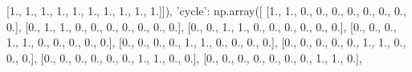 \documentclass[11pt]{article}
\newenvironment{Shaded}{}{}
\newcommand{\DecValTok}[1]{\textcolor[rgb]{0.25,0.63,0.44}{{#1}}}
\newcommand{\StringTok}[1]{\textcolor[rgb]{0.25,0.44,0.63}{{#1}}}
\newcommand{\NormalTok}[1]{{#1}}
\begin{document}
\begin{Shaded}
\begin{Highlighting}[]
\NormalTok{        [}\DecValTok{1}\NormalTok{., }\DecValTok{1}\NormalTok{., }\DecValTok{1}\NormalTok{., }\DecValTok{1}\NormalTok{., }\DecValTok{1}\NormalTok{., }\DecValTok{1}\NormalTok{., }\DecValTok{1}\NormalTok{., }\DecValTok{1}\NormalTok{., }\DecValTok{1}\NormalTok{., }\DecValTok{1}\NormalTok{.]]),}
    \StringTok{'cycle'}\NormalTok{: np.array([}
\NormalTok{        [}\DecValTok{1}\NormalTok{., }\DecValTok{1}\NormalTok{., }\DecValTok{0}\NormalTok{., }\DecValTok{0}\NormalTok{., }\DecValTok{0}\NormalTok{., }\DecValTok{0}\NormalTok{., }\DecValTok{0}\NormalTok{., }\DecValTok{0}\NormalTok{., }\DecValTok{0}\NormalTok{., }\DecValTok{0}\NormalTok{.],}
\NormalTok{        [}\DecValTok{0}\NormalTok{., }\DecValTok{1}\NormalTok{., }\DecValTok{1}\NormalTok{., }\DecValTok{0}\NormalTok{., }\DecValTok{0}\NormalTok{., }\DecValTok{0}\NormalTok{., }\DecValTok{0}\NormalTok{., }\DecValTok{0}\NormalTok{., }\DecValTok{0}\NormalTok{., }\DecValTok{0}\NormalTok{.],}
\NormalTok{        [}\DecValTok{0}\NormalTok{., }\DecValTok{0}\NormalTok{., }\DecValTok{1}\NormalTok{., }\DecValTok{1}\NormalTok{., }\DecValTok{0}\NormalTok{., }\DecValTok{0}\NormalTok{., }\DecValTok{0}\NormalTok{., }\DecValTok{0}\NormalTok{., }\DecValTok{0}\NormalTok{., }\DecValTok{0}\NormalTok{.],}
\NormalTok{        [}\DecValTok{0}\NormalTok{., }\DecValTok{0}\NormalTok{., }\DecValTok{0}\NormalTok{., }\DecValTok{1}\NormalTok{., }\DecValTok{1}\NormalTok{., }\DecValTok{0}\NormalTok{., }\DecValTok{0}\NormalTok{., }\DecValTok{0}\NormalTok{., }\DecValTok{0}\NormalTok{., }\DecValTok{0}\NormalTok{.],}
\NormalTok{        [}\DecValTok{0}\NormalTok{., }\DecValTok{0}\NormalTok{., }\DecValTok{0}\NormalTok{., }\DecValTok{0}\NormalTok{., }\DecValTok{1}\NormalTok{., }\DecValTok{1}\NormalTok{., }\DecValTok{0}\NormalTok{., }\DecValTok{0}\NormalTok{., }\DecValTok{0}\NormalTok{., }\DecValTok{0}\NormalTok{.],}
\NormalTok{        [}\DecValTok{0}\NormalTok{., }\DecValTok{0}\NormalTok{., }\DecValTok{0}\NormalTok{., }\DecValTok{0}\NormalTok{., }\DecValTok{0}\NormalTok{., }\DecValTok{1}\NormalTok{., }\DecValTok{1}\NormalTok{., }\DecValTok{0}\NormalTok{., }\DecValTok{0}\NormalTok{., }\DecValTok{0}\NormalTok{.],}
\NormalTok{        [}\DecValTok{0}\NormalTok{., }\DecValTok{0}\NormalTok{., }\DecValTok{0}\NormalTok{., }\DecValTok{0}\NormalTok{., }\DecValTok{0}\NormalTok{., }\DecValTok{0}\NormalTok{., }\DecValTok{1}\NormalTok{., }\DecValTok{1}\NormalTok{., }\DecValTok{0}\NormalTok{., }\DecValTok{0}\NormalTok{.],}
\NormalTok{        [}\DecValTok{0}\NormalTok{., }\DecValTok{0}\NormalTok{., }\DecValTok{0}\NormalTok{., }\DecValTok{0}\NormalTok{., }\DecValTok{0}\NormalTok{., }\DecValTok{0}\NormalTok{., }\DecValTok{0}\NormalTok{., }\DecValTok{1}\NormalTok{., }\DecValTok{1}\NormalTok{., }\DecValTok{0}\NormalTok{.],}

\end{Highlighting}
\end{Shaded}
\end{document}

